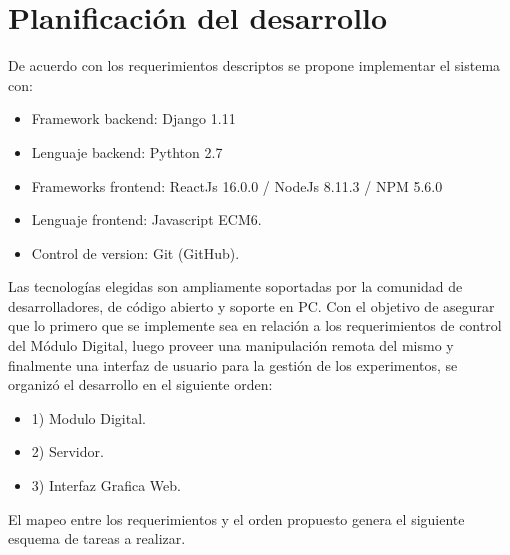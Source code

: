 \section{Planificaci\'on del desarrollo}


De acuerdo con los requerimientos descriptos se propone implementar el sistema con:

\begin{itemize}
    \item Framework backend: Django 1.11
    \item Lenguaje backend: Pythton 2.7
    \item Frameworks frontend: ReactJs 16.0.0 / NodeJs 8.11.3 / NPM 5.6.0
    \item Lenguaje frontend: Javascript ECM6.
    \item Control de version: Git (GitHub).
\end{itemize}
Las tecnolog\'ias elegidas son ampliamente soportadas por la comunidad de desarrolladores, de c\'odigo abierto y soporte en PC. Con el objetivo de asegurar que lo primero que se implemente sea en relaci\'on a los requerimientos 
de control del M\'odulo Digital, luego proveer una manipulaci\'on remota del mismo y finalmente una interfaz de
usuario para la gesti\'on de los experimentos, se organiz\'o el desarrollo en el siguiente orden:
\begin{itemize}
    \item 1) Modulo Digital.
    \item 2) Servidor.
    \item 3) Interfaz Grafica Web.
\end{itemize}
El mapeo entre los requerimientos y el orden propuesto genera el siguiente esquema de tareas a realizar.
